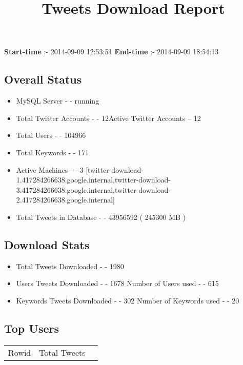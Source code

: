 \documentclass{article}\usepackage[T1]{fontenc}
\begin{document}
\title{\textbf{Tweets Download Report}}
               \date{}
                \maketitle
               \centerline{\textbf{Start-time} :- 2014-09-09 12:53:51 \hspace{40pt} \textbf{End-time} :- 2014-09-09 18:54:13}               \subsection*{Overall Status}                \begin{itemize}                \item MySQL Server - - running               \item Total Twitter Accounts - - 12\newline Active Twitter Accounts -- 12               \item Total Users - - 104966               \item Total Keywords - - 171               \item Active Machines - - 3 [twitter-download-1.417284266638.google.internal,twitter-download-3.417284266638.google.internal,twitter-download-2.417284266638.google.internal]               \item Total Tweets in Database - - 43956592 ( 245300 MB )               \end{itemize}               \subsection*{Download Stats}                \begin{itemize}                \item Total Tweets Downloaded - - 1980               \item Users Tweets Downloaded - - 1678 \newline Number of Users used - - 615               \item Keywords Tweets Downloaded - - 302 \newline Number of Keywords used - - 20              \end{itemize}              \subsection*{Top Users}\begin{tabular}{|c|c|c|}         \hline         Rowid & Total Tweets \\ 

\end{tabular}
\end{document}
